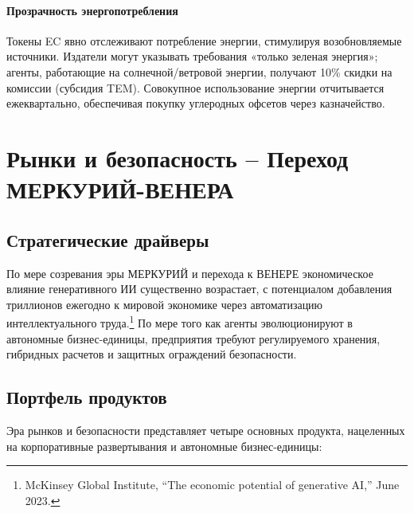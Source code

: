 \documentclass[11pt]{article}
\begin{document}
\paragraph{Прозрачность энергопотребления} Токены EC явно отслеживают потребление энергии, стимулируя возобновляемые источники. Издатели могут указывать требования «только зеленая энергия»; агенты, работающие на солнечной/ветровой энергии, получают 10\% скидки на комиссии (субсидия TEM). Совокупное использование энергии отчитывается ежеквартально, обеспечивая покупку углеродных офсетов через казначейство.

\section{Рынки и безопасность -- Переход МЕРКУРИЙ-ВЕНЕРА}
\subsection{Стратегические драйверы}
По мере созревания эры МЕРКУРИЙ и перехода к ВЕНЕРЕ экономическое влияние генеративного ИИ существенно возрастает, с потенциалом добавления триллионов ежегодно к мировой экономике через автоматизацию интеллектуального труда.\footnote{McKinsey Global Institute, ``The economic potential of generative AI,'' June 2023.} По мере того как агенты эволюционируют в автономные бизнес-единицы, предприятия требуют регулируемого хранения, гибридных расчетов и защитных ограждений безопасности.

\subsection{Портфель продуктов}
Эра рынков и безопасности представляет четыре основных продукта, нацеленных на корпоративные развертывания и автономные бизнес-единицы:
\end{document}
